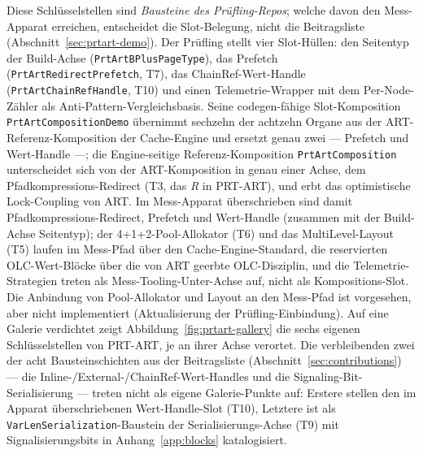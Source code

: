 \begin{nurlang}
Diese Schlüsselstellen sind \emph{Bausteine des Prüfling-Repos}; welche davon den Mess-Apparat erreichen,
entscheidet die Slot-Belegung, nicht die Beitragsliste (Abschnitt~\ref{sec:prtart-demo}). Der Prüfling
stellt vier Slot-Hüllen: den Seitentyp der Build-Achse (\texttt{PrtArtBPlusPageType}), das Prefetch
(\texttt{PrtArtRedirectPrefetch}, T7), das ChainRef-Wert-Handle (\texttt{PrtArtChainRefHandle}, T10) und
einen Telemetrie-Wrapper mit dem Per-Node-Zähler als Anti-Pattern-Vergleichsbasis. Seine codegen-fähige
Slot-Komposition \texttt{PrtArtCompositionDemo} übernimmt sechzehn der achtzehn Organe aus der
ART-Referenz-Komposition der Cache-Engine und ersetzt genau zwei --- Prefetch und Wert-Handle ---; die
Engine-seitige Referenz-Komposition \texttt{PrtArtComposition} unterscheidet sich von der ART-Komposition
in genau einer Achse, dem Pfadkompressions-Redirect (T3, das \emph{R} in PRT-ART), und erbt das
optimistische Lock-Coupling von ART\@. Im Mess-Apparat überschrieben sind damit Pfadkompressions-Redirect,
Prefetch und Wert-Handle (zusammen mit der Build-Achse Seitentyp); der 4+1+2-Pool-Allokator (T6) und das
MultiLevel-Layout (T5) laufen im Mess-Pfad über den Cache-Engine-Standard, die reservierten
OLC-Wert-Blöcke über die von ART geerbte OLC-Disziplin, und die Telemetrie-Strategien treten als
Mess-Tooling-Unter-Achse auf, nicht als Kompositions-Slot. Die Anbindung von Pool-Allokator und Layout an
den Mess-Pfad ist vorgesehen, aber nicht implementiert (Aktualisierung der Prüfling-Einbindung).
Auf eine Galerie verdichtet zeigt Abbildung~\ref{fig:prtart-gallery} die sechs eigenen Schlüsselstellen
von PRT-ART, je an ihrer Achse verortet. Die verbleibenden zwei der acht Bausteinschichten aus der
Beitragsliste (Abschnitt~\ref{sec:contributions}) --- die Inline-/External-/ChainRef-Wert-Handles und
die Signaling-Bit-Serialisierung --- treten nicht als eigene Galerie-Punkte auf: Erstere stellen den im
Apparat überschriebenen Wert-Handle-Slot (T10), Letztere ist als
\texttt{Var\allowbreak{}Len\allowbreak{}Serialization}-Baustein der Serialisierungs-Achse (T9) mit
Signalisierungsbits in Anhang~\ref{app:blocks} katalogisiert.
\begin{figure}[htbp]\centering
\end{figure}
\end{nurlang}
